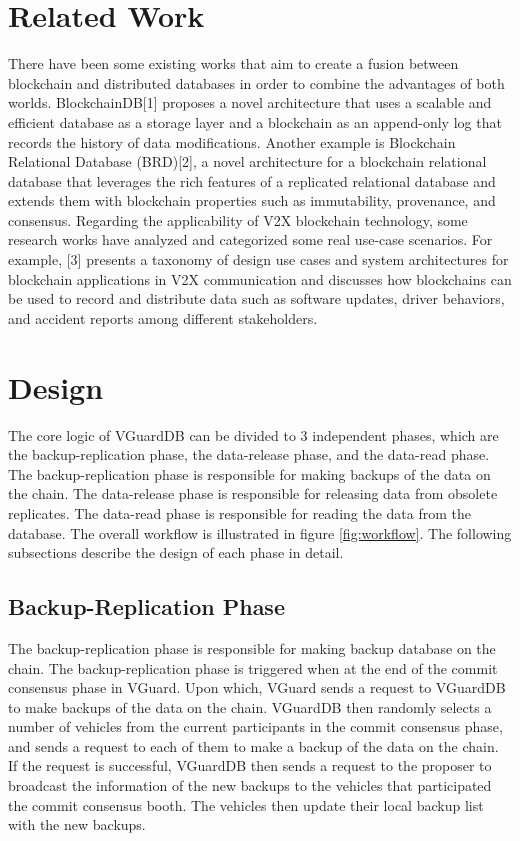 \section{Related Work}
There have been some existing works that aim to create a fusion between blockchain and distributed databases in order to combine the advantages of both worlds. BlockchainDB[1] proposes a novel architecture that uses a scalable and efficient database as a storage layer and a blockchain as an append-only log that records the history of data modifications. Another example is Blockchain Relational Database (BRD)[2], a novel architecture for a blockchain relational database that leverages the rich features of a replicated relational database and extends them with blockchain properties such as immutability, provenance, and consensus.
Regarding the applicability of V2X blockchain technology, some research works have analyzed and categorized some real use-case scenarios. For example,  [3] presents a taxonomy of design use cases and system architectures for blockchain applications in V2X communication and discusses how blockchains can be used to record and distribute data such as software updates, driver behaviors, and accident reports among different stakeholders. 

\section{Design}
The core logic of VGuardDB can be divided to 3 independent phases, which are the backup-replication phase, the data-release phase, and the data-read phase. The backup-replication phase is responsible for making backups of the data on the chain. The data-release phase is responsible for releasing data from obsolete replicates. The data-read phase is responsible for reading the data from the database. The overall workflow is illustrated in figure \ref{fig:workflow}. The following subsections describe the design of each phase in detail.

\subsection{Backup-Replication Phase}
The backup-replication phase is responsible for making backup database on the chain. The backup-replication phase is triggered when at the end of the commit consensus phase in VGuard. Upon which, VGuard sends a request to VGuardDB to make backups of the data on the chain. VGuardDB then randomly selects a number of vehicles from the current participants in the commit consensus phase, and sends a request to each of them to make a backup of the data on the chain. If the request is successful, VGuardDB then sends a request to the proposer to broadcast the information of the new backups to the vehicles that participated the commit consensus booth. The vehicles then update their local backup list with the new backups.

